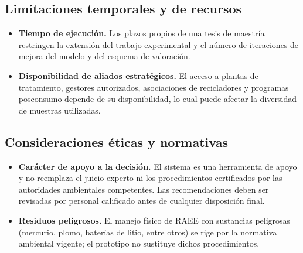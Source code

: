 \subsection{Limitaciones temporales y de recursos}
\begin{itemize}
    \item \textbf{Tiempo de ejecución.} Los plazos propios de una tesis de maestría restringen la extensión del trabajo experimental y el número de iteraciones de mejora del modelo y del esquema de valoración.
    \item \textbf{Disponibilidad de aliados estratégicos.} El acceso a plantas de tratamiento, gestores autorizados, asociaciones de recicladores y programas posconsumo depende de su disponibilidad, lo cual puede afectar la diversidad de muestras utilizadas.
\end{itemize}

\subsection{Consideraciones éticas y normativas}
\begin{itemize}
    \item \textbf{Carácter de apoyo a la decisión.} El sistema es una herramienta de apoyo y no reemplaza el juicio experto ni los procedimientos certificados por las autoridades ambientales competentes. Las recomendaciones deben ser revisadas por personal calificado antes de cualquier disposición final.
    \item \textbf{Residuos peligrosos.} El manejo físico de RAEE con sustancias peligrosas (mercurio, plomo, baterías de litio, entre otros) se rige por la normativa ambiental vigente; el prototipo no sustituye dichos procedimientos.
\end{itemize}
